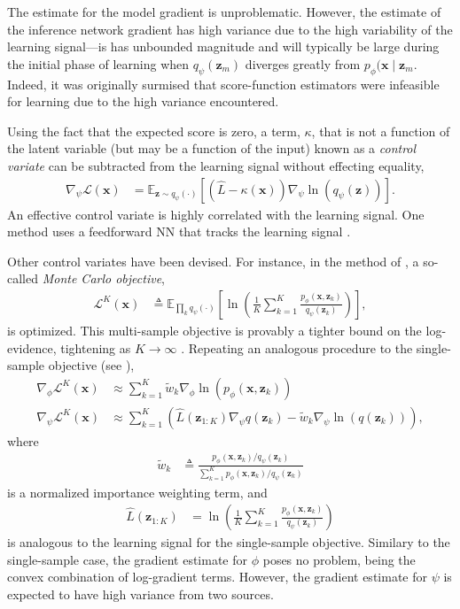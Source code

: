 The estimate for the model gradient is unproblematic. However, the estimate of the inference network gradient has high variance due to the high variability of the learning signal---is has unbounded magnitude and will typically be large during the initial phase of learning when $q_\psi(\mathbf{z}_m)$ diverges greatly from $p_\phi(\mathbf{x}\mid\mathbf{z}_m$. Indeed, it was originally surmised that score-function estimators were infeasible for learning due to the high variance encountered.

Using the fact that the expected score is zero, a term, $\kappa$, that is not a function of the latent variable (but may be a function of the input) known as a \emph{control variate} can be subtracted from the learning signal without effecting equality,
\begin{align*}
	\nabla_\psi\mathcal{L}(\mathbf{x}) &= \mathbb{E}_{\mathbf{z}\sim q_\psi(\cdot)}\left[(\hat{L}-\kappa(\mathbf{x}))\nabla_\psi\ln\left(q_\psi(\mathbf{z})\right)\right].
\end{align*}
An effective control variate is highly correlated with the learning signal. One method uses a feedforward NN that tracks the learning signal \citep{MnihGregor2014}.

Other control variates have been devised. For instance, in the method of \citet{MnihRezende2016}, a so-called \emph{Monte Carlo objective},
\begin{align}\label{eq:mc-objective}
	\mathcal{L}^K(\mathbf{x}) &\triangleq \mathbb{E}_{\prod_kq_\psi(\cdot)}\left[\ln\left(\frac{1}{K}\sum^K_{k=1}\frac{p_\phi(\mathbf{x},\mathbf{z}_k)}{q_\psi(\mathbf{z}_k)}\right)\right],
\end{align}
is optimized. This multi-sample objective is provably a tighter bound on the log-evidence, tightening as $K\rightarrow\infty$ \citep{BurdaEtAl2016}. Repeating an analogous procedure to the single-sample objective (see \citep[Appendix D]{MnihRezende2016}),
\begin{align*}
	\nabla_\phi\mathcal{L}^K(\mathbf{x}) &\approx \sum^K_{k=1}\tilde{w}_k\nabla_\phi\ln(p_\phi(\mathbf{x},\mathbf{z}_k))\\
	\nabla_\psi\mathcal{L}^K(\mathbf{x}) &\approx \sum^K_{k=1}\left(\hat{L}(\mathbf{z}_{1:K})\nabla_\psi q(\mathbf{z}_k) - \tilde{w}_k\nabla_\psi\ln\left(q(\mathbf{z}_k)\right)\right),
\end{align*}
where
\begin{align*}
	\tilde{w}_k &\triangleq \frac{p_\phi(\mathbf{x},\mathbf{z}_k)/q_\psi(\mathbf{z}_k)}{\sum^K_{k=1}p_\phi(\mathbf{x},\mathbf{z}_k)/q_\psi(\mathbf{z}_k)}
\end{align*}
is a normalized importance weighting term, and
\begin{align*}
	\hat{L}(\mathbf{z}_{1:K}) &= \ln\left(\frac{1}{K}\sum^K_{k=1}\frac{p_\phi(\mathbf{x},\mathbf{z}_k)}{q_\psi(\mathbf{z}_k)}\right)
\end{align*}
is analogous to the learning signal for the single-sample objective. Similary to the single-sample case, the gradient estimate for $\phi$ poses no problem, being the convex combination of log-gradient terms. However, the gradient estimate for $\psi$ is expected to have high variance from two sources.

